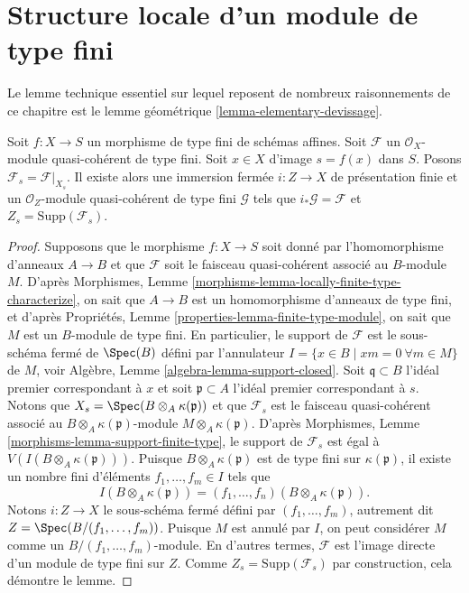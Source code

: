 \section{Structure locale d'un module de type fini}
\label{section-local-structure-module}

\noindent
Le lemme technique essentiel sur lequel reposent de nombreux raisonnements de ce
chapitre est le lemme géométrique
\ref{lemma-elementary-devissage}.

\begin{lemma}
\label{lemma-sheaf-lives-on-subscheme}
Soit $f : X \to S$ un morphisme de type fini de schémas affines.
Soit $\mathcal{F}$ un $\mathcal{O}_X$-module quasi-cohérent de type fini.
Soit $x \in X$ d'image $s = f(x)$ dans $S$.
Posons $\mathcal{F}_s = \mathcal{F}|_{X_s}$.
Il existe alors une immersion fermée $i : Z \to X$ de présentation finie
et un $\mathcal{O}_Z$-module quasi-cohérent de type fini $\mathcal{G}$
tels que $i_*\mathcal{G} = \mathcal{F}$ et
$Z_s = \text{Supp}(\mathcal{F}_s)$.
\end{lemma}

\begin{proof}
Supposons que le morphisme $f : X \to S$ soit donné par l'homomorphisme d'anneaux
$A \to B$ et que $\mathcal{F}$ soit le faisceau quasi-cohérent
associé au $B$-module $M$. D'après
Morphismes, Lemme \ref{morphisms-lemma-locally-finite-type-characterize},
on sait que $A \to B$ est un homomorphisme d'anneaux de type fini, et d'après
Propriétés, Lemme \ref{properties-lemma-finite-type-module},
on sait que $M$ est un $B$-module de type fini. En particulier, le
support de $\mathcal{F}$ est le sous-schéma fermé de $\Spec(B)$
défini par l'annulateur
$I = \{x \in B \mid xm = 0\ \forall m \in M\}$ de $M$, voir
Algèbre, Lemme \ref{algebra-lemma-support-closed}.
Soit $\mathfrak q \subset B$ l'idéal premier correspondant à $x$
et soit $\mathfrak p \subset A$ l'idéal premier correspondant à $s$.
Notons que $X_s = \Spec(B \otimes_A \kappa(\mathfrak p))$ et
que $\mathcal{F}_s$ est le faisceau quasi-cohérent associé au
$B \otimes_A \kappa(\mathfrak p)$-module $M \otimes_A \kappa(\mathfrak p)$. D'après
Morphismes, Lemme \ref{morphisms-lemma-support-finite-type},
le support de $\mathcal{F}_s$ est égal à
$V(I(B \otimes_A \kappa(\mathfrak p)))$. Puisque
$B \otimes_A \kappa(\mathfrak p)$ est de type fini sur $\kappa(\mathfrak p)$,
il existe un nombre fini d'éléments $f_1, \ldots, f_m \in I$
tels que
$$
I(B \otimes_A \kappa(\mathfrak p)) =
(f_1, \ldots, f_n)(B \otimes_A \kappa(\mathfrak p)).
$$
Notons $i : Z \to X$ le sous-schéma fermé défini par
$(f_1, \ldots, f_m)$, autrement dit $Z = \Spec(B/(f_1, \ldots, f_m))$.
Puisque $M$ est annulé par $I$, on peut considérer $M$ comme un
$B/(f_1, \ldots, f_m)$-module. En d'autres termes, $\mathcal{F}$ est
l'image directe d'un module de type fini sur $Z$.
Comme $Z_s = \text{Supp}(\mathcal{F}_s)$ par construction, cela
démontre le lemme.
\end{proof}


